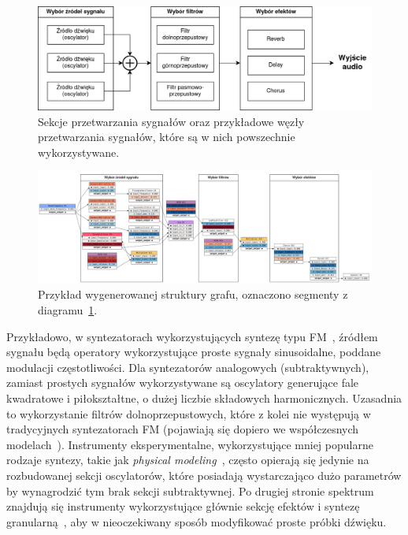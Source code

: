 \begin{figure}[H]
    \centering
    \includegraphics[width=0.8\linewidth]{rys06/synth_architecture.png}
    \caption{
      Sekcje przetwarzania sygnałów oraz przykładowe węzły przetwarzania
      sygnałów, które są w nich powszechnie wykorzystywane.
    }\label{fig:synth_architecture_diagram}
\end{figure}

\begin{figure}[H]
    \centering
    \includegraphics[width=1.0\linewidth]{rys06/example_generated_graph.png}
    \caption{
      Przykład wygenerowanej struktury grafu, oznaczono segmenty z diagramu~\ref{fig:synth_architecture_diagram}.
    }\label{fig:example_generated_graph}
\end{figure}


Przykładowo, w syntezatorach wykorzystujących syntezę typu FM~\cite{yamaha_dx7_manual}, źródłem
sygnału będą operatory wykorzystujące proste sygnały sinusoidalne, poddane modulacji częstotliwości.
Dla syntezatorów analogowych (subtraktywnych), zamiast prostych sygnałów wykorzystywane są
oscylatory generujące fale kwadratowe i piłokształtne, o dużej liczbie składowych harmonicznych.
Uzasadnia to wykorzystanie filtrów dolnoprzepustowych, które z kolei nie występują w tradycyjnych
syntezatorach FM (pojawiają się dopiero we współczesnych modelach~\cite{digitone_manual}).
Instrumenty eksperymentalne, wykorzystujące mniej popularne rodzaje syntezy, takie jak
\textit{physical modeling}~\cite{yamaha_vl1_manual}, często opierają się jedynie na rozbudowanej
sekcji oscylatorów, które posiadają wystarczająco dużo parametrów by wynagrodzić tym brak
sekcji subtraktywnej. Po drugiej stronie spektrum znajdują się instrumenty wykorzystujące
głównie sekcję efektów i syntezę granularną~\cite{microcosm_hologram_manual},
aby w nieoczekiwany sposób modyfikować proste próbki dźwięku.

